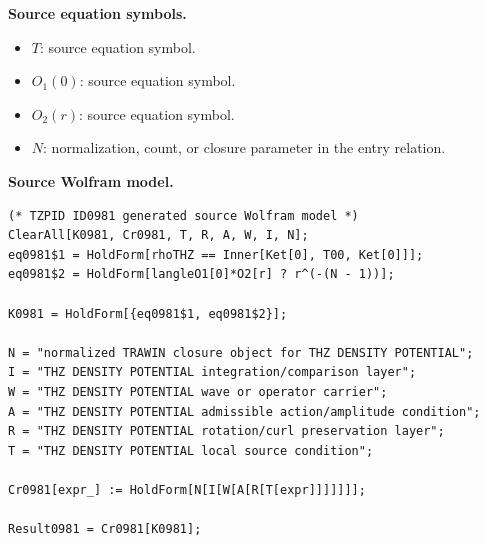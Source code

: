 \begin{minipage}[t]{0.49\linewidth}
\begingroup
\small
\raggedright
\textbf{Source equation symbols.}\par
\begin{itemize}[leftmargin=1.35em,itemsep=1pt,topsep=1pt,parsep=0pt]
    \item $T$: source equation symbol.
    \item $O_1(0)$: source equation symbol.
    \item $O_2(r)$: source equation symbol.
    \item $N$: normalization, count, or closure parameter in the entry relation.
\end{itemize}
\endgroup
\end{minipage}\hfill
\begin{minipage}[t]{0.47\linewidth}
\begingroup
\scriptsize
\raggedright
\textbf{Source Wolfram model.}\par
\begin{Verbatim}[fontsize=\tiny,breaklines=true,breakanywhere=true]
(* TZPID ID0981 generated source Wolfram model *)
ClearAll[K0981, Cr0981, T, R, A, W, I, N];
eq0981$1 = HoldForm[rhoTHZ == Inner[Ket[0], T00, Ket[0]]];
eq0981$2 = HoldForm[langleO1[0]*O2[r] ? r^(-(N - 1))];

K0981 = HoldForm[{eq0981$1, eq0981$2}];

N = "normalized TRAWIN closure object for THZ DENSITY POTENTIAL";
I = "THZ DENSITY POTENTIAL integration/comparison layer";
W = "THZ DENSITY POTENTIAL wave or operator carrier";
A = "THZ DENSITY POTENTIAL admissible action/amplitude condition";
R = "THZ DENSITY POTENTIAL rotation/curl preservation layer";
T = "THZ DENSITY POTENTIAL local source condition";

Cr0981[expr_] := HoldForm[N[I[W[A[R[T[expr]]]]]]];

Result0981 = Cr0981[K0981];
\end{Verbatim}
\endgroup
\end{minipage}

